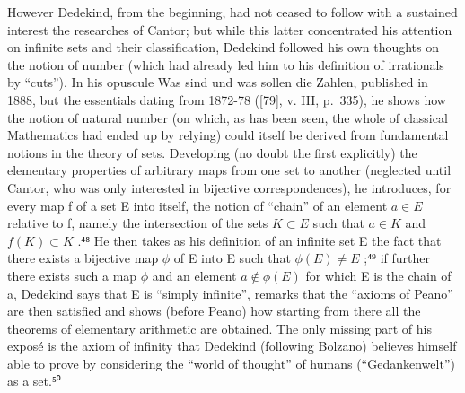 However Dedekind, from the beginning, had not ceased to follow with a sustained interest the researches of Cantor; but while this latter concentrated his attention on infinite sets and their classification, Dedekind followed his own thoughts on the notion of number (which had already led him to his definition of irrationals by ``cuts''). In his opuscule Was sind und was sollen die Zahlen, published in 1888, but the essentials dating from 1872-78 ({[}79{]}, v. III, p.~335), he shows how the notion of natural number (on which, as has been seen, the whole of classical Mathematics had ended up by relying) could itself be derived from fundamental notions in the theory of sets. Developing (no doubt the first explicitly) the elementary properties of arbitrary maps from one set to another (neglected until Cantor, who was only interested in bijective correspondences), he introduces, for every map f of a set E into itself, the notion of ``chain'' of an element \(a \in E\) relative to f, namely the intersection of the sets \(K \subset E\) such that \(a \in K\) and \(f(K) \subset K\) .⁴⁸ He then takes as his definition of an infinite set E the fact that there exists a bijective map \(\phi\) of E into E such that \(\phi(E) \neq E\) ;⁴⁹ if further there exists such a map \(\phi\) and an element \(a \notin \phi(E)\) for which E is the chain of a, Dedekind says that E is ``simply infinite'', remarks that the ``axioms of Peano'' are then satisfied and shows (before Peano) how starting from there all the theorems of elementary arithmetic are obtained. The only missing part of his exposé is the axiom of infinity that Dedekind (following Bolzano) believes himself able to prove by considering the ``world of thought'' of humans (``Gedankenwelt'') as a set.⁵⁰

